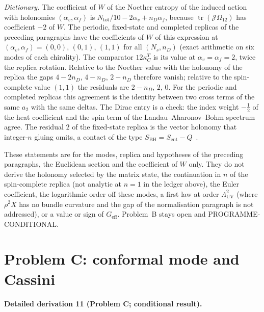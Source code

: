 \emph{Dictionary.} The coefficient of \(W\) of the Noether entropy of the induced action with holonomies \((\alpha_v,\alpha_f)\) is \(N_{\mathrm{tot}}/10-2\alpha_v+n_D\alpha_f\), because \(\operatorname{tr}(\mathcal J\Omega_{12})\) has coefficient \(-2\) of \(W\). The periodic, fixed-state and completed replicas of the preceding paragraphs have the coefficients of \(W\) of this expression at \((\alpha_v,\alpha_f)=(0,0)\), \((0,1)\), \((1,1)\) for all \((N_s,n_D)\) (exact arithmetic on six modes of each chirality). The comparator \(12\kappa_C^T\) is its value at \(\alpha_v=\alpha_f=2\), twice the replica rotation. Relative to the Noether value with the holonomy of the replica the gaps \(4-2n_D\), \(4-n_D\), \(2-n_D\) therefore vanish; relative to the spin-complete value \((1,1)\) the residuals are \(2-n_D\), \(2\), \(0\). For the periodic and completed replicas this agreement is the identity between two cross terms of the same \(a_2\) with the same deltas. The Dirac entry is a check: the index weight \(-\tfrac12\) of the heat coefficient and the spin term of the Landau--Aharonov--Bohm spectrum agree. The residual \(2\) of the fixed-state replica is the vector holonomy that integer-\(n\) gluing omits, a contact of the type \(S_{\mathrm{BH}}=S_{\mathrm{ent}}-Q\)~\cite{FrolovFursaev1997}.



These statements are for the modes, replica and hypotheses of the preceding paragraphs, the Euclidean section and the coefficient of \(W\) only. They do not derive the holonomy selected by the matrix state, the continuation in \(n\) of the spin-complete replica (not analytic at \(n=1\) in the ledger above), the Euler coefficient, the logarithmic order off these modes, a first law at order \(\Lambda_{\mathrm{UV}}^2\) (where \(\rho^2X\) has no bundle curvature and the gap of the normalisation paragraph is not addressed), or a value or sign of \(G_{\mathrm{eff}}\). Problem~B stays open and PROGRAMME-CONDITIONAL.



\section{Problem C: conformal mode and Cassini}

\label{sec:status-C}



\paragraph{Detailed derivation 11 (Problem C; conditional result).} \label{ref:detail-10} %



